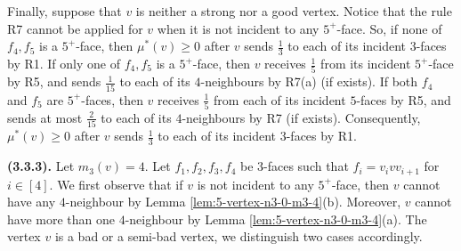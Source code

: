 \documentclass[12pt, reqno]{amsart}
\theoremstyle{plain}
\theoremstyle{definition}
\numberwithin{equation}{section}
\begin{document}
%
%
%
%
%

Finally, suppose that $v$ is neither a strong nor a good vertex.  Notice that the rule R7 cannot be applied for $v$ when it is not incident to any $5^+$-face. So, if none of $f_4,f_5$ is a $5^+$-face, then $\mu^*(v)\geq 0$ after $v$ sends $\frac{1}{3}$ to each of its incident $3$-faces by R1.
If only one of $f_4,f_5$ is a $5^+$-face, then  $v$ receives $\frac{1}{5}$ from its incident $5^+$-face by R5, and sends $\frac{1}{15}$ to each of its $4$-neighbours  by R7(a) (if exists). If both $f_4$ and $f_5$ are $5^+$-faces, then  $v$ receives $\frac{1}{5}$ from each of its incident $5$-faces by R5, and sends at most $\frac{2}{15}$ to each of its $4$-neighbours by R7 (if exists). Consequently,  $\mu^*(v)\geq 0$ after $v$ sends $\frac{1}{3}$ to each of its incident $3$-faces by R1. \medskip


\textbf{(3.3.3).} Let $m_3(v)=4$. Let $f_1,f_2,f_3,f_4$ be $3$-faces such that $f_i=v_ivv_{i+1}$ for $i\in [4]$. 
We first observe that if $v$ is not incident to any $5^+$-face, then $v$ cannot have any  $4$-neighbour by Lemma \ref{lem:5-vertex-n3-0-m3-4}(b). Moreover, $v$ cannot have more than one $4$-neighbour by Lemma \ref{lem:5-vertex-n3-0-m3-4}(a). The vertex $v$ is a bad or a semi-bad vertex, we distinguish two cases accordingly.\medskip
\end{document}
